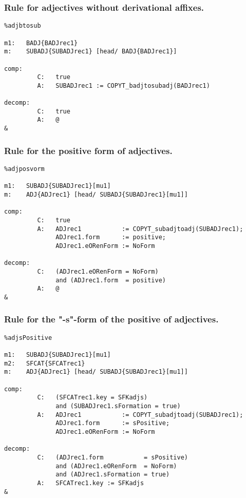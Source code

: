 \subsubsection{Rule for adjectives without derivational affixes.}
\begin{verbatim}
%adjbtosub

m1:   BADJ{BADJrec1}
m:    SUBADJ{SUBADJrec1} [head/ BADJ{BADJrec1}]

comp:    
         C:   true
         A:   SUBADJrec1 := COPYT_badjtosubadj(BADJrec1)

decomp:  
         C:   true
         A:   @
&
\end{verbatim}
\newpage
\subsubsection{Rule for the positive form of adjectives.}
\begin{verbatim}
%adjposvorm

m1:   SUBADJ{SUBADJrec1}[mu1]
m:    ADJ{ADJrec1} [head/ SUBADJ{SUBADJrec1}[mu1]]

comp:    
         C:   true
         A:   ADJrec1           := COPYT_subadjtoadj(SUBADJrec1);
              ADJrec1.form      := positive;
              ADJrec1.eORenForm := NoForm

decomp:  
         C:   (ADJrec1.eORenForm = NoForm)
              and (ADJrec1.form  = positive)
         A:   @
&
\end{verbatim}
\newpage
\subsubsection{Rule for the "-s"-form of the positive of adjectives.}
\begin{verbatim}
%adjsPositive

m1:   SUBADJ{SUBADJrec1}[mu1]
m2:   SFCAT{SFCATrec1}
m:    ADJ{ADJrec1} [head/ SUBADJ{SUBADJrec1}[mu1]]

comp:    
         C:   (SFCATrec1.key = SFKadjs) 
              and (SUBADJrec1.sFormation = true)
         A:   ADJrec1           := COPYT_subadjtoadj(SUBADJrec1);
              ADJrec1.form      := sPositive;
              ADJrec1.eORenForm := NoForm

decomp:  
         C:   (ADJrec1.form           = sPositive)
              and (ADJrec1.eORenForm  = NoForm)
              and (ADJrec1.sFormation = true)
         A:   SFCATrec1.key := SFKadjs
&
\end{verbatim}
\newpage
